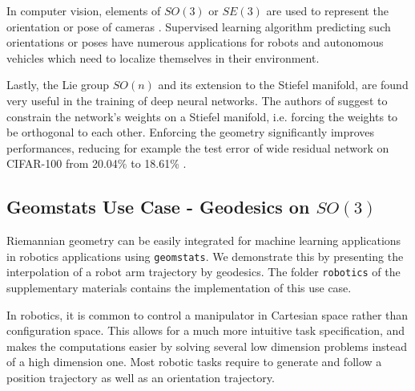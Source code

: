 \documentclass{article}
\begin{document}
In computer vision, elements of $SO(3)$ or $SE(3)$ are used to represent the orientation or pose of cameras \cite{Kendall2015}. Supervised learning algorithm predicting such orientations or poses have numerous applications for robots and autonomous vehicles which need to localize themselves in their environment.

Lastly, the Lie group $SO(n)$ and its extension to the Stiefel manifold, are found very useful in the training of deep neural networks. The authors of \cite{Huang2017} suggest to constrain the network's weights on a Stiefel manifold, i.e. forcing the weights to be orthogonal to each other. Enforcing the geometry significantly improves performances, reducing for example the test error of wide residual network on CIFAR-100 from 20.04\% to 18.61\% .

\subsection{Geomstats Use Case - Geodesics on $SO(3)$}\label{sec:son}


Riemannian geometry can be easily integrated for machine learning applications in robotics applications using \texttt{geomstats}. We demonstrate this by presenting the interpolation of a robot arm trajectory by geodesics. The folder \texttt{robotics} of the supplementary materials contains the implementation of this use case.

In robotics, it is common to control a manipulator in Cartesian space rather than configuration space. This allows for a much more intuitive task specification, and makes the computations easier by solving several low dimension problems instead of a high dimension one. Most robotic tasks require to generate and follow a position trajectory as well as an orientation trajectory. 
\end{document}
